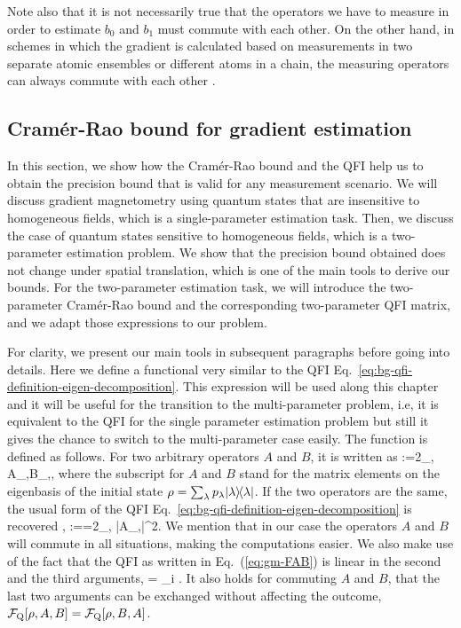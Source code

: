 Note also that it is not necessarily true that the operators we have to measure in order to estimate $b_0$ and $b_1$ must commute with each other.
On the other hand, in schemes in which the gradient is calculated based on measurements in two separate atomic ensembles or different atoms in a chain, the measuring operators can always commute with each other \cite{Wasilewski2010, Eckert2006, Zhang2014}.

\subsection{Cram\'er-Rao bound for gradient estimation}
\label{sec:gm-cramer-rao-bounds}

In this section, we show how the Cram\'er-Rao bound and the QFI help us to obtain the precision bound that is valid for any measurement scenario.
We will discuss gradient magnetometry using quantum states that are insensitive to homogeneous fields, which is a single-parameter estimation task.
Then, we discuss the case of quantum states sensitive to homogeneous fields, which is a two-parameter estimation problem.
We show that the precision bound obtained does not change under spatial translation, which is one of the main tools to derive our bounds.
For the two-parameter estimation task, we will introduce the two-parameter Cram\'er-Rao bound and the corresponding two-parameter QFI matrix, and we adapt those expressions to our problem.

For clarity, we present our main tools in subsequent paragraphs before going into details.
Here we define a functional very similar to the QFI Eq.~\eqref{eq:bg-qfi-definition-eigen-decomposition}.
This expression will be used along this chapter and it will be useful for the transition to the multi-parameter problem, i.e, it is equivalent to the QFI for the single parameter estimation problem but still it gives the chance to switch to the multi-parameter case easily.
The function is defined as follows.
For two arbitrary operators $A$ and $B$, it is written as
\be
  \label{eq:gm-FAB}
  :=2\sum_{\lambda,\nu}
  {A}_{\lambda,\nu}{B}_{\nu,\lambda},
\ee
where the subscript for $A$ and $B$ stand for the matrix elements on the eigenbasis of the initial state $\rho = \sum_\lambda p_\lambda\vert{\lambda}\rangle{\!}\langle{\lambda}\vert$.
If the two operators are the same, the usual form of the QFI Eq.~\eqref{eq:bg-qfi-definition-eigen-decomposition} is recovered \cite{Paris2009, Braunstein1994, Holevo1982, Helstrom1976, Petz2002, Petz2008},
\be
  :==2\sum_{\lambda,\nu}
   |{A}_{\lambda,\nu}|^2.
\ee
We mention that in our case the operators $A$ and $B$ will commute in all situations, making the computations easier.
We also make use of the fact that the QFI as written in Eq.~(\ref{eq:gm-FAB}) is linear in the second and the third arguments,
\be
  \label{eq:gm-qfi-linear-in-arguments}
   = \sum_i .
\ee
It also holds for commuting $A$ and $B$, that the last two arguments can be exchanged without affecting the outcome, $\mathcal{F}_{\textnormal{Q}}[{\textstyle \rho, A, B}] = \mathcal{F}_{\textnormal{Q}}[{\textstyle \rho, B,A}]$.

